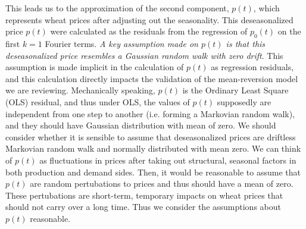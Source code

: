 \documentclass{article}
\begin{document}
	This leads us to the approximation of the second component, $p(t)$, which represents wheat prices after adjusting out the seasonality. This deseasonalized price $p(t)$ were calculated as the residuals from the regression of $p_0(t)$ on the first $k=1$ Fourier terms. \textit{A key assumption made on $p(t)$ is that this deseasonalized price resembles a Gaussian random walk with zero drift}. This assumption is made implicit in the calculation of $p(t)$ as regression residuals, and this calculation directly impacts the validation of the mean-reversion model we are reviewing. Mechanically speaking, $p(t)$ is the Ordinary Least Square (OLS) residual, and thus under OLS, the values of $p(t)$ supposedly are independent from one step to another (i.e. forming a Markovian random walk), and they should have Gaussian distribution with mean of zero. We should consider whether it is sensible to assume that deseasonalized prices are driftless Markovian random walk and normally distributed with mean zero. We can think of $p(t)$ as fluctuations in prices after taking out structural, seasonal factors in both production and demand sides. Then, it would be reasonable to assume that $p(t)$ are random pertubations to prices and thus should have a mean of zero. These pertubations are short-term, temporary impacts on wheat prices that should not carry over a long time. Thus we consider the assumptions about $p(t)$ reasonable.
	



\end{document}
